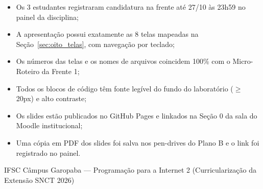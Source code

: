 \begin{checklist}
\begin{itemize}[label={\caixaMarcar}, itemsep=0.35em]
  \item Os 3 estudantes registraram candidatura na frente até 27/10 às 23h59 no painel da disciplina;
  \item A apresentação possui exatamente as 8 telas mapeadas na Seção~\ref{sec:oito_telas}, com navegação por teclado;
  \item Os números das telas e os nomes de arquivos coincidem 100\% com o Micro-Roteiro da Frente 1;
  \item Todos os blocos de código têm fonte legível do fundo do laboratório ($\ge$ 20px) e alto contraste;
  \item Os slides estão publicados no GitHub Pages e linkados na Seção 0 da sala do Moodle institucional;
  \item Uma cópia em PDF dos slides foi salva nos pen-drives do Plano B e o link foi registrado no painel.
\end{itemize}
\end{checklist}

\vfill
{\centering\footnotesize\color{suave}\faMapMarkerAlt\hspace{0.4em}IFSC Câmpus Garopaba — Programação para a Internet 2 (Curricularização da Extensão SNCT 2026)\par}

